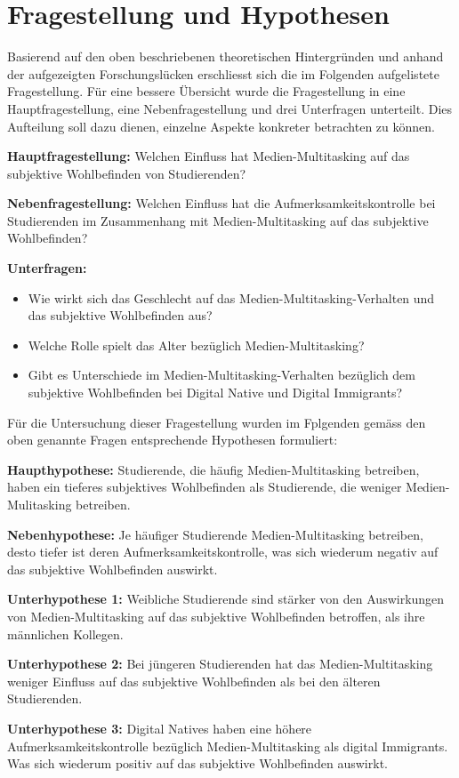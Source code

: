 \section{Fragestellung und Hypothesen}\label{section.fragestellung}
Basierend auf den oben beschriebenen theoretischen Hintergründen und anhand der aufgezeigten Forschungslücken erschliesst sich die im Folgenden aufgelistete Fragestellung. Für eine bessere Übersicht wurde die Fragestellung in eine Hauptfragestellung, eine Nebenfragestellung und drei Unterfragen unterteilt. Dies Aufteilung soll dazu dienen, einzelne Aspekte konkreter betrachten zu können. \par
\textbf{Hauptfragestellung:} Welchen Einfluss hat Medien-Multitasking auf das subjektive Wohlbefinden von Studierenden?\par
\textbf{Nebenfragestellung:} Welchen Einfluss hat die Aufmerksamkeitskontrolle bei Studierenden im Zusammenhang mit Medien-Multitasking auf das subjektive Wohlbefinden?\par
\textbf{Unterfragen:}
\begin{itemize}
    \item Wie wirkt sich das Geschlecht auf das Medien-Multitasking-Verhalten und das subjektive Wohlbefinden aus?
    \item Welche Rolle spielt das Alter bezüglich Medien-Multitasking?
    \item Gibt es Unterschiede im Medien-Multitasking-Verhalten bezüglich dem subjektive Wohlbefinden bei Digital Native und Digital Immigrants?
\end{itemize}
Für die Untersuchung dieser Fragestellung wurden im Fplgenden gemäss den oben genannte Fragen entsprechende Hypothesen formuliert:\par
\textbf{Haupthypothese:}
Studierende, die häufig Medien-Multitasking betreiben, haben ein tieferes subjektives Wohlbefinden als Studierende, die weniger Medien-Mulitasking betreiben.\par
\textbf{Nebenhypothese:}
Je häufiger Studierende Medien-Multitasking betreiben, desto tiefer ist deren Aufmerksamkeitskontrolle, was sich wiederum negativ auf das subjektive Wohlbefinden auswirkt.\par
\textbf{Unterhypothese 1:} Weibliche Studierende sind stärker von den Auswirkungen von Medien-Multitasking auf das subjektive Wohlbefinden betroffen, als ihre männlichen Kollegen.\par
\textbf{Unterhypothese 2:} Bei jüngeren Studierenden hat das Medien-Multitasking weniger Einfluss auf das subjektive Wohlbefinden als bei den älteren Studierenden.\par
\textbf{Unterhypothese 3:} Digital Natives haben eine höhere Aufmerksamkeitskontrolle bezüglich Medien-Multitasking als digital Immigrants. Was sich wiederum positiv auf das subjektive Wohlbefinden auswirkt.






